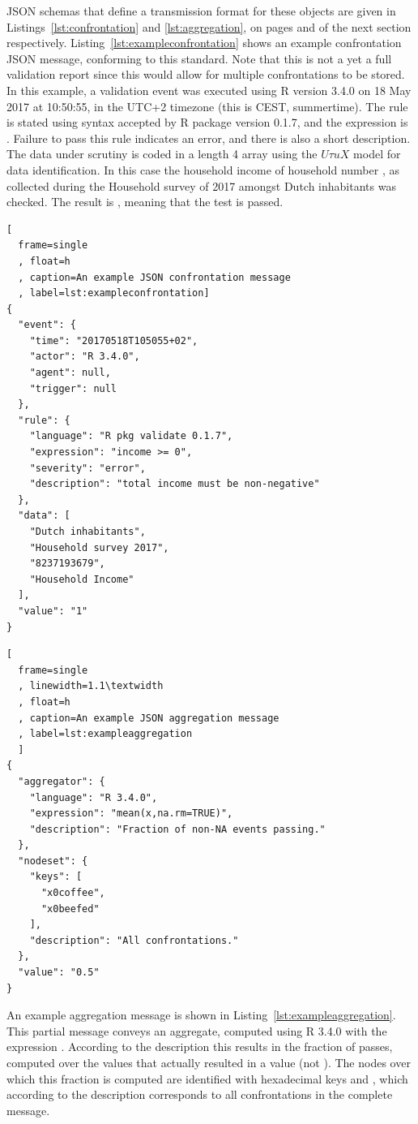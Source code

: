 JSON schemas that define a transmission format for these objects are given in
Listings~\ref{lst:confrontation} and \ref{lst:aggregation}, on pages
\pageref{lst:confrontation} and \pageref{lst:aggregation} of the next section
respectively. Listing~\ref{lst:exampleconfrontation} shows an example
confrontation JSON message, conforming to this standard. Note that this is not
a yet a full validation report since this would allow for multiple
confrontations to be stored.  In this example, a validation event was executed
using R version 3.4.0 on 18 May 2017 at 10:50:55, in the UTC+2 timezone (this
is CEST, summertime).  The rule is stated using syntax accepted by R package
 version 0.1.7, and the expression is .
Failure to pass this rule indicates an error, and there is also a short
description. The data under scrutiny is coded in a length 4 array using the
$U\tau uX$ model for data identification.  In this case the household income of
household number , as collected during the Household survey
of 2017 amongst Dutch inhabitants was checked. The result is , meaning
that the test is passed.
%
\begin{lstlisting}[
  frame=single
  , float=h
  , caption=An example JSON confrontation message
  , label=lst:exampleconfrontation]
{
  "event": {
    "time": "20170518T105055+02",
    "actor": "R 3.4.0",
    "agent": null,
    "trigger": null
  },
  "rule": {
    "language": "R pkg validate 0.1.7",
    "expression": "income >= 0",
    "severity": "error",
    "description": "total income must be non-negative"
  },
  "data": [
    "Dutch inhabitants",
    "Household survey 2017",
    "8237193679",
    "Household Income"
  ],
  "value": "1"
}
\end{lstlisting}
\begin{lstlisting}[
  frame=single
  , linewidth=1.1\textwidth
  , float=h
  , caption=An example JSON aggregation message
  , label=lst:exampleaggregation
  ]
{
  "aggregator": {
    "language": "R 3.4.0",
    "expression": "mean(x,na.rm=TRUE)",
    "description": "Fraction of non-NA events passing."
  },
  "nodeset": {
    "keys": [
      "x0coffee",
      "x0beefed"
    ],
    "description": "All confrontations."
  },
  "value": "0.5"
}
\end{lstlisting}

An example aggregation message is shown in
Listing~\ref{lst:exampleaggregation}.  This partial message conveys an
aggregate, computed using R 3.4.0 with the expression . According to the description this results in the fraction of
passes, computed over the values that actually resulted in a value (not \na{}).
The nodes over which this fraction is computed are identified with hexadecimal
keys  and , which according to the description
corresponds to all confrontations in the complete message.
%


